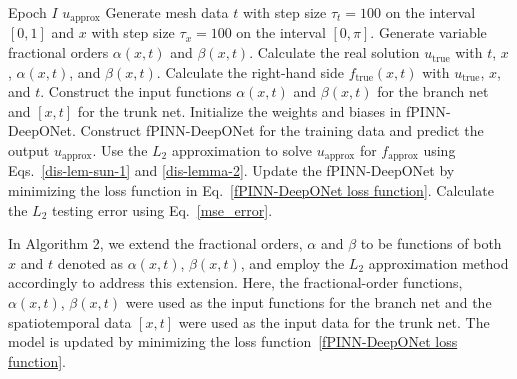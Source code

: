 \documentclass[11pt]{article}
\begin{document}
\begin{algorithm}[H]
\caption{Solving variable fractional-order FPDE using fPINN-DeepONet}
\label{alg:variable-fpde}
\begin{algorithmic}[1]
\Require Epoch $I$
\Ensure $u_{\mathrm{approx}}$
\State Generate mesh data $t$ with step size $\tau_t=100$ on the interval $[0,1]$ and $x$ with step size $\tau_x=100$ on the interval $[0,\pi]$.
\State Generate variable fractional orders $\alpha(x,t)$ and $\beta(x,t)$.
\State Calculate the real solution $u_{\mathrm{true}}$ with $t$, $x$, $\alpha(x,t)$, and $\beta(x,t)$.
\State Calculate the right-hand side $f_{\mathrm{true}}(x,t)$ with $u_{\mathrm{true}}$, $x$, and $t$.
\State Construct the input functions $\alpha(x,t)$ and $\beta(x,t)$ for the branch net and $[x,t]$ for the trunk net.
\State Initialize the weights and biases in fPINN-DeepONet.
    \State Construct fPINN-DeepONet for the training data and predict the output $u_{\mathrm{approx}}$.
    \State Use the $L_2$ approximation to solve $u_{\mathrm{approx}}$ for $f_{\mathrm{approx}}$ using Eqs.~\eqref{dis-lem-sun-1} and \eqref{dis-lemma-2}.
    \State Update the fPINN-DeepONet by minimizing the loss function in Eq.~\eqref{fPINN-DeepONet loss function}.
\EndFor
\State Calculate the $L_2$ testing error using Eq.~\eqref{mse_error}.
\end{algorithmic}
\end{algorithm}


In Algorithm 2, we extend the fractional orders, $\alpha$ and $\beta$ to be functions of both $x$ and $t$ denoted as $\alpha(x,t)$, $\beta(x,t)$, and employ the $L_2$ approximation method accordingly to address this extension.  Here, the fractional-order functions, $\alpha(x,t)$, $\beta(x,t)$ were used as the input functions for the branch net and the spatiotemporal data $[x,t]$ were used as the input data for the trunk net. The model is updated by minimizing the loss function~\ref{fPINN-DeepONet loss function}.
\end{document}
